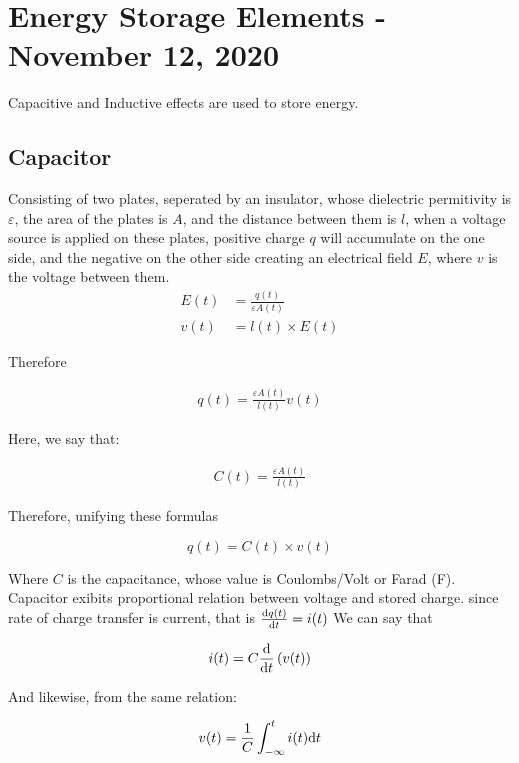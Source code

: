\documentclass[11pt,a4paper]{book}
\begin{document}
\chapter{Energy Storage Elements - November 12, 2020}

Capacitive and Inductive effects are used to store energy.

\section{Capacitor}

Consisting of  two plates, seperated by an insulator, whose dielectric permitivity is $\varepsilon$, the area of the plates is $A$, and the distance between them is $l$, when a voltage source is applied on these plates, positive charge $q$ will accumulate on the one side, and the negative on the other side creating an electrical field $E$, where $v$ is the voltage between them.\\

\begin{align*}
E(t) &= \frac{q(t)}{\varepsilon A(t)}\\
v(t) &= l(t) \times E(t)
\end{align*}

Therefore

\begin{align*}
q(t) = \frac{\varepsilon A(t)}{l(t)} v(t)
\end{align*}

Here, we say that:

\begin{align*}
C(t) = \frac{\varepsilon A(t)}{l(t)}
\end{align*}

Therefore, unifying these formulas

\begin{equation}
q(t) = C(t) \times v(t)
\end{equation}

Where $C$ is the capacitance, whose value is Coulombs/Volt or Farad (F). Capacitor exibits proportional relation between voltage and stored charge. since rate of charge transfer is current, that is $\frac{\text{d} q(t)}{\text{d} t} = i(t)$ We can say that

\begin{equation}
i(t) = C \frac{\text{d}}{\text{d} t} \left( v(t) \right)
\end{equation}

And likewise, from the same relation:

\begin{equation}
v(t) = \frac{1}{C} \int_{-\infty}^{t} i(t) \text{d} t
\end{equation}
\end{document}
